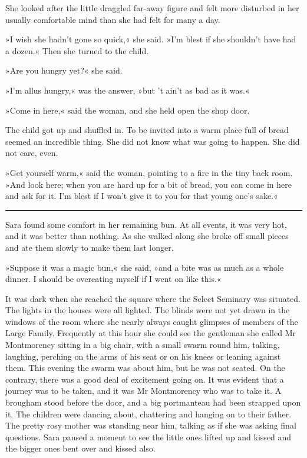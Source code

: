 She looked after the little draggled far-away figure and felt more disturbed in her usually comfortable mind than she had felt for many a day.

»I wish she hadn't gone so quick,« she said. »I'm blest if she shouldn't have had a dozen.« Then she turned to the child.

»Are you hungry yet?« she said.

»I'm allus hungry,« was the answer, »but 't ain't as bad as it was.«

»Come in here,« said the woman, and she held open the shop door.

The child got up and shuffled in. To be invited into a warm place full of bread seemed an incredible thing. She did not know what was going to happen. She did not care, even.

»Get yourself warm,« said the woman, pointing to a fire in the tiny back room. »And look here; when you are hard up for a bit of bread, you can come in here and ask for it. I'm blest if I won't give it to you for that young one's sake.«

\noindent\hfil\rule{0.5\textwidth}{.4pt}\hfil 

Sara found some comfort in her remaining bun. At all events, it was very hot, and it was better than nothing. As she walked along she broke off small pieces and ate them slowly to make them last longer.

»Suppose it was a magic bun,« she said, »and a bite was as much as a whole dinner. I should be overeating myself if I went on like this.«

It was dark when she reached the square where the Select Seminary was situated. The lights in the houses were all lighted. The blinds were not yet drawn in the windows of the room where she nearly always caught glimpses of members of the Large Family. Frequently at this hour she could see the gentleman she called Mr Montmorency sitting in a big chair, with a small swarm round him, talking, laughing, perching on the arms of his seat or on his knees or leaning against them. This evening the swarm was about him, but he was not seated. On the contrary, there was a good deal of excitement going on. It was evident that a journey was to be taken, and it was Mr Montmorency who was to take it. A brougham stood before the door, and a big portmanteau had been strapped upon it. The children were dancing about, chattering and hanging on to their father. The pretty rosy mother was standing near him, talking as if she was asking final questions. Sara paused a moment to see the little ones lifted up and kissed and the bigger ones bent over and kissed also.

